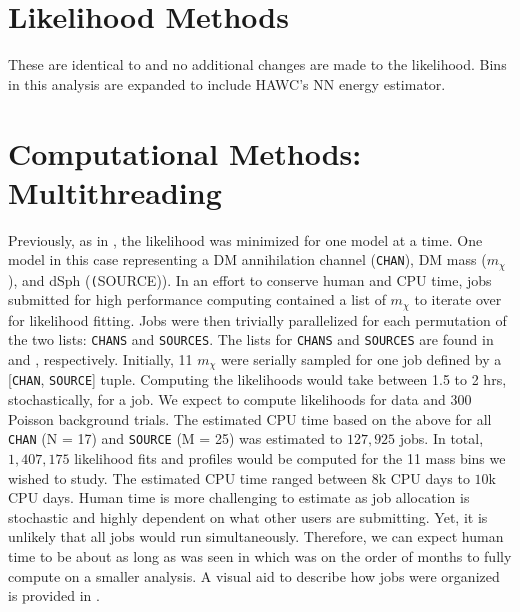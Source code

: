 \section{Likelihood Methods} \label{sec:mtd_ll_methods}

These are identical to  and no additional changes are made to the likelihood.
Bins in this analysis are expanded to include HAWC's NN energy estimator.

\section{Computational Methods: Multithreading} \label{sec:mtd_comp_methods}

Previously, as in , the likelihood was minimized for one model at a time.
One model in this case representing a DM annihilation channel (\texttt{CHAN}), DM mass ($m_\chi$), and dSph (\texttt(SOURCE)).
In an effort to conserve human and CPU time, jobs submitted for high performance computing contained a list of $m_\chi$ to iterate over for likelihood fitting.
Jobs were then trivially parallelized for each permutation of the two lists: \texttt{CHANS} and \texttt{SOURCES}.
The lists for \texttt{CHANS} and \texttt{SOURCES} are found in  and , respectively.
Initially, 11 $m_\chi$ were serially sampled for one job defined by a [\texttt{CHAN}, \texttt{SOURCE}] tuple.
Computing the likelihoods would take between 1.5 to 2 hrs, stochastically, for a job.
We expect to compute likelihoods for data and 300 Poisson background trials.
The estimated CPU time based on the above for all \texttt{CHAN} (N = 17) and \texttt{SOURCE} (M = 25) was estimated to $127,925$ jobs.
In total, $1,407,175$ likelihood fits and profiles would be computed for the 11 mass bins we wished to study.
The estimated CPU time ranged between $8$k CPU days to $10$k CPU days.
Human time is more challenging to estimate as job allocation is stochastic and highly dependent on what other users are submitting.
Yet, it is unlikely that all jobs would run simultaneously.
Therefore, we can expect human time to be about as long as was seen in  which was on the order of months to fully compute on a smaller analysis.
A visual aid to describe how jobs were organized is provided in .

